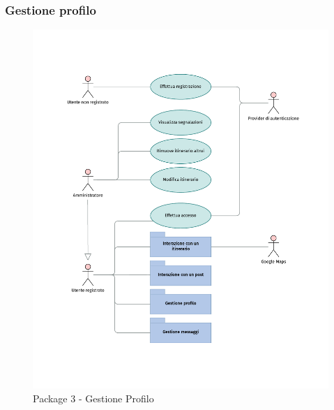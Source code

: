 \documentclass{natourDoc}
\begin{document}
\subsubsection{Gestione profilo}
\begin{figure}[!htbp]
	\centering
	\includegraphics[width=\textwidth, page=5]{./diagrams/useCase.pdf}
	\caption{Package 3 - Gestione Profilo}
\end{figure}
\FloatBarrier

\newpage
\end{document}
